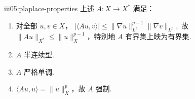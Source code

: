 \begin{FAProposition}{iii05:plaplace-properties}
上述 \(\displaystyle A:X\to X^*\) 满足：
\begin{enumerate}
\item 对全部 \(\displaystyle u,v\in X\)，
\(\displaystyle |\langle Au,v\rangle| \leqslant \|\nabla u\|_{L^p}^{p-1} \|\nabla v\|_{L^p},\)
故 \(\displaystyle\|Au\|_{X^*}\leqslant\|u\|_X^{p-1}\)，特别地 \(\displaystyle A\) 有界集上映为有界集.
\item \(\displaystyle A\) 半连续型.
\item \(\displaystyle A\) 严格单调.
\item \(\displaystyle\langle Au,u\rangle=\|u\|_X^p\)，故 \(\displaystyle A\) 强制.
\end{enumerate}
\end{FAProposition}

